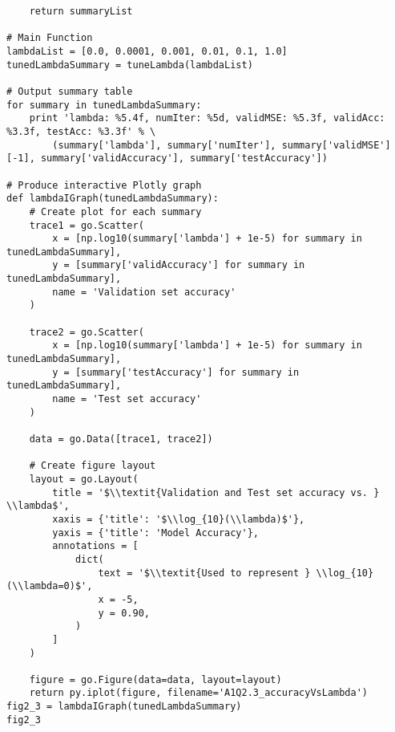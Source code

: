 \documentclass[a4paper,12pt]{article}
\begin{document}
\begin{verbatim}
    return summaryList
    
# Main Function
lambdaList = [0.0, 0.0001, 0.001, 0.01, 0.1, 1.0]
tunedLambdaSummary = tuneLambda(lambdaList)

# Output summary table
for summary in tunedLambdaSummary:
    print 'lambda: %5.4f, numIter: %5d, validMSE: %5.3f, validAcc: %3.3f, testAcc: %3.3f' % \
        (summary['lambda'], summary['numIter'], summary['validMSE'][-1], summary['validAccuracy'], summary['testAccuracy'])
        
# Produce interactive Plotly graph
def lambdaIGraph(tunedLambdaSummary):
    # Create plot for each summary
    trace1 = go.Scatter(
        x = [np.log10(summary['lambda'] + 1e-5) for summary in tunedLambdaSummary],
        y = [summary['validAccuracy'] for summary in tunedLambdaSummary],
        name = 'Validation set accuracy'
    )
    
    trace2 = go.Scatter(
        x = [np.log10(summary['lambda'] + 1e-5) for summary in tunedLambdaSummary],
        y = [summary['testAccuracy'] for summary in tunedLambdaSummary],
        name = 'Test set accuracy'
    )
    
    data = go.Data([trace1, trace2])
    
    # Create figure layout
    layout = go.Layout(
        title = '$\\textit{Validation and Test set accuracy vs. } \\lambda$',
        xaxis = {'title': '$\\log_{10}(\\lambda)$'},
        yaxis = {'title': 'Model Accuracy'},
        annotations = [
            dict(
                text = '$\\textit{Used to represent } \\log_{10}(\\lambda=0)$',
                x = -5,
                y = 0.90,
            )
        ]
    )

    figure = go.Figure(data=data, layout=layout)
    return py.iplot(figure, filename='A1Q2.3_accuracyVsLambda')
fig2_3 = lambdaIGraph(tunedLambdaSummary)
fig2_3
\end{verbatim}
\end{document}
